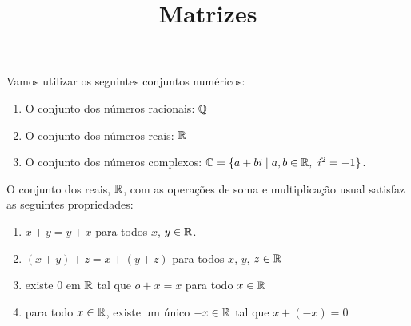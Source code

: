 \documentclass{beamer}
\title{Matrizes}
\author[\autor]{\autor}
\date{}
\begin{document}
    \begin{frame}
        \maketitle
    \end{frame}


    \begin{frame}

      \begin{observacao}
        Vamos utilizar os seguintes conjuntos numéricos:
        \begin{enumerate}[label={\arabic*})]
          \item O conjunto dos números racionais: $\mathbb{Q}$

          \item O conjunto dos números reais: $\mathbb{R}$

          \item O conjunto dos números complexos: $\mathbb{C} = \{a + bi \mid a, b
            \in \mathbb{R},\ i^2 = -1\}$.
        \end{enumerate}
      \end{observacao}

      \begin{teorema}
        O conjunto dos reais, $\mathbb{R}$, com as operações de soma e multiplicação
        usual satisfaz as seguintes propriedades:
        \begin{enumerate}[label={\roman*})]
          \seti
          \item $x + y = y + x$ para todos $x$, $y \in \mathbb{R}$.

          \item $(x + y) + z = x + (y + z)$ para todos $x$, $y$, $z \in \mathbb{R}$

          \item existe 0 em $\mathbb{R}$ tal que $o + x = x$ para todo $x \in \mathbb{R}$

          \item para todo $x \in \mathbb{R}$, existe um único $-x \in \mathbb{R}$ tal que
            $x + (-x) = 0$
        \end{enumerate}

      \end{teorema}
    \end{frame}
\end{document}
